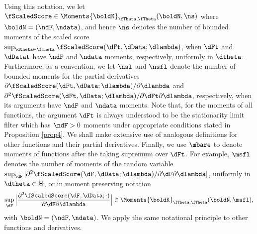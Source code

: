 Using this notation, we let $\fScaledScore \in \Moments{\boldK}_{\fTheta,\fTheta}(\boldN,\ns)$ where $\boldN=(\ndF,\ndata)$, and hence $\ns$ denotes the number of bounded moments of the scaled score $\sup_{\dtheta \in \fTheta}\fScaledScore(\dFt,\dData;\dlambda)$, when $\dFt$ and $\dDatat$ have $\ndF$ and $\ndata$ moments, respectively, uniformly in $\dtheta$. 
Furthermore, as a convention, we let $\nsl$ and $\nsfl$ denote the number of bounded moments for the partial derivatives
$\partial\fScaledScore(\dFt,\dData;\dlambda)/\partial\dlambda$
and
$\partial^2\fScaledScore(\dFt,\dData;\dlambda)/\partial\dFt\partial\dlambda$, 
respectively, when its arguments have $\ndF$ and $\ndata$ moments.
Note that, for the moments of all functions, the argument 
$\dFt$ is always understood to be the stationarity limit filter which has 
$\ndF>0$ moments under appropriate conditions stated in Proposition 
\ref{prop4}. We shall make extensive use of analogous definitions for other 
functions and their partial derivatives.  Finally, we use $\mbare$ to denote moments 
of functions after the taking supremum over $\dFt$. For example, $\msfl$  denotes 
the number of moments of the random variable
$\sup_{\dF}|\partial^2\fScaledScore(\dF,\dData;\dlambda)/ \partial\dF\partial\dlambda|$, uniformly in $\dtheta  \in \Theta$, or in moment preserving notation
\begin{equation*}
\sup_{\dF}\Big|\frac{\partial^2\fScaledScore(\dF,\dData;\cdot)}{\partial\dF\partial\dlambda} \Big| \in  \Moments{\boldK}_{\fTheta,\fTheta}(\boldN,\msfl),
\end{equation*}
with $\boldN=(\ndF,\ndata)$.
We apply the same notational principle to other functions and derivatives.




